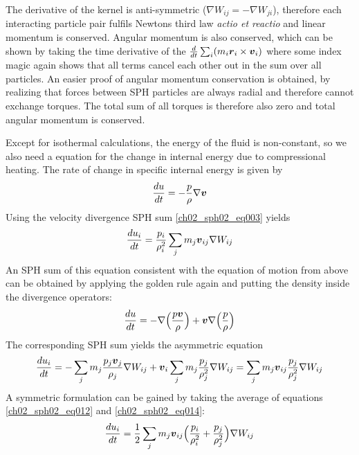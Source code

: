 The derivative of the kernel is anti-symmetric ($\nabla W_{ij} = - \nabla W_{ji}$), therefore each interacting particle pair fulfils Newtons third law \emph{actio et reactio} and linear momentum is conserved. Angular momentum is also conserved, which can be shown by taking the time derivative of the $\frac{d}{dt} \sum_i (m_i \boldsymbol{r}_i \times \boldsymbol{v}_i)$ where some index magic \citep{Price:2004p2613} again shows that all terms cancel each other out in the sum over all particles. An easier proof of angular momentum conservation is obtained, by realizing that forces between SPH particles are always radial and therefore cannot exchange torques. The total sum of all torques is therefore also zero and total angular momentum is conserved.

Except for isothermal calculations, the energy of the fluid is non-constant, so we also need a equation for the change in internal energy due to compressional heating. The rate of change in specific internal energy is given by 
\begin{equation}
\label{ch02_sph02_eq011}
\frac{du}{dt} = -\frac{p}{\rho} \nabla \boldsymbol{v}
\end{equation}
Using the velocity divergence SPH sum \ref{ch02_sph02_eq003}  yields
\begin{equation}
\label{ch02_sph02_eq012}
\frac{du_i}{dt} = \frac{p_i}{\rho_i^2} \sum_{j} m_j \boldsymbol{v}_{ij}  \nabla W_{ij}
\end{equation}
An SPH sum of this equation consistent with the equation of motion from above can be obtained by applying the golden rule again and putting the density inside the divergence operators:
\begin{equation}
\label{ch02_sph02_eq013}
\frac{du}{dt} = - \nabla \Big( \frac{p \boldsymbol{v}}{\rho} \Big) + \boldsymbol{v} \nabla \Big( \frac{p}{\rho} \Big)
\end{equation}
The corresponding SPH sum yields the asymmetric equation
\begin{equation}
\label{ch02_sph02_eq014}
\frac{du_i}{dt} = - \sum_{j} m_{j} \frac{p_j \boldsymbol{v}_j}{\rho_j} \nabla W_{ij} + \boldsymbol{v}_i \sum_{j} m_{j} \frac{p_j}{\rho_j^2}  \nabla W_{ij} = \sum_{j} m_j \boldsymbol{v}_{ij} \frac{p_j}{\rho_j^2}  \nabla W_{ij}
\end{equation}
A symmetric formulation can be gained by taking the average of equations \ref{ch02_sph02_eq012} and \ref{ch02_sph02_eq014}:
\begin{equation}
\label{ch02_sph02_eq015}
\frac{du_i}{dt} = \frac{1}{2} \sum_{j} m_{j} \boldsymbol{v}_{ij} \Big( \frac{p_i}{\rho_i^2}  + \frac{p_j}{\rho_j^2} \Big) \nabla W_{ij}
\end{equation}

